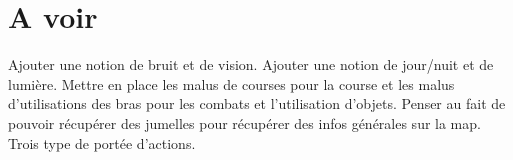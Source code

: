 \section{A voir}
Ajouter une notion de bruit et de vision. Ajouter une notion de jour/nuit et de lumière.
Mettre en place les malus de courses pour la course et les malus d'utilisations des bras pour les combats et l'utilisation d'objets. Penser au fait de pouvoir récupérer des jumelles pour récupérer des infos générales sur la map. Trois type de portée d'actions.
